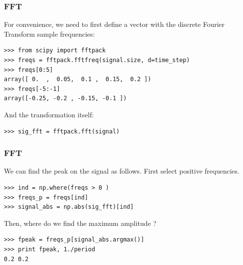 \documentclass[10pt,colorlinks]{beamer}
\begin{document}
\begin{frame}[fragile]\frametitle{FFT}
For convenience, we need to first define a vector with the discrete Fourier Transform sample frequencies: 

\begin{verbatim}
>>> from scipy import fftpack
>>> freqs = fftpack.fftfreq(signal.size, d=time_step)
>>> freqs[0:5]
array([ 0.  ,  0.05,  0.1 ,  0.15,  0.2 ])
>>> freqs[-5:-1] 
array([-0.25, -0.2 , -0.15, -0.1 ])
\end{verbatim}

And the transformation itself: 
\begin{verbatim}
>>> sig_fft = fftpack.fft(signal)
\end{verbatim}

\end{frame}

\begin{frame}[fragile]\frametitle{FFT}
We can find the peak on the signal as follows. First select positive frequencies.   

\begin{verbatim}
>>> ind = np.where(freqs > 0 )
>>> freqs_p = freqs[ind]
>>> signal_abs = np.abs(sig_fft)[ind]
\end{verbatim}

Then, where do we find the maximum amplitude ?
\begin{verbatim}
>>> fpeak = freqs_p[signal_abs.argmax()]
>>> print fpeak, 1./period 
0.2 0.2
\end{verbatim}


\end{frame}
\end{document}

